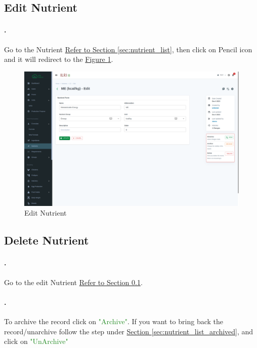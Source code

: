 \subsection{Edit Nutrient }\label{sec:nutrient_edit}
\setcounter{stepcounter}{1}
\paragraph{.}Go to the Nutrient  \hyperref[sec:nutrient_list]{Refer to Section \ref{sec:nutrient_list}}, then click on Pencil icon and it will redirect to the \hyperref[fig:nutrient_edit_page]{Figure \ref{fig:nutrient_edit_page}}.
\begin{figure}[h!]
  	\includegraphics[width=15cm]{screenshots/nutrient_edit_page.png}
  	\caption{Edit Nutrient }
  	\label{fig:nutrient_edit_page}
\end{figure}

\subsection{Delete Nutrient }
\setcounter{stepcounter}{1}
\paragraph{.}Go to the edit Nutrient  \hyperref[sec:nutrient_edit]{Refer to Section \ref{sec:nutrient_edit}}.

\paragraph{.}To archive the record click on \textcolor{ForestGreen}{"Archive"}. If you want to bring back the record/unarchive follow the step under \hyperref[sec:nutrient_list_archived]{Section  \ref{sec:nutrient_list_archived}}, and click on \textcolor{ForestGreen}{"UnArchive"}



